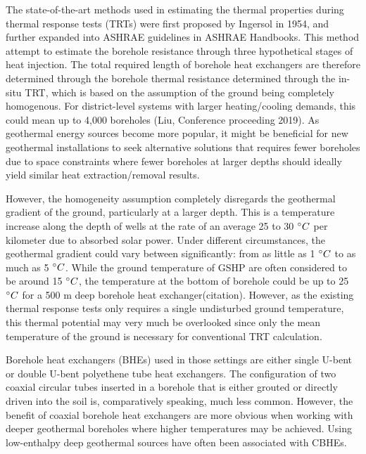 The state-of-the-art methods used in estimating the thermal properties during thermal response tests (TRTs) were first proposed by Ingersol in 1954, and further expanded into ASHRAE guidelines in ASHRAE Handbooks. This method attempt to estimate the borehole resistance through three hypothetical stages of heat injection. The total required length of borehole heat exchangers are therefore determined through the borehole thermal resistance determined through the in-situ TRT, which is based on the assumption of the ground being completely homogenous. For district-level systems with larger heating/cooling demands, this could mean up to 4,000 boreholes (Liu, Conference proceeding 2019). As geothermal energy sources become more popular, it might be beneficial for new geothermal installations to seek alternative solutions that requires fewer boreholes due to space constraints where fewer boreholes at larger depths should ideally yield similar heat extraction/removal results.

However, the homogeneity assumption completely disregards the geothermal gradient of the ground, particularly at a larger depth. This is a temperature increase along the depth of wells at the rate of an average 25 to 30 $\degree C$ per kilometer due to absorbed solar power. Under different circumstances, the geothermal gradient could vary between significantly: from as little as 1 $\degree C$ to as much as 5 $\degree C$. While the ground temperature of GSHP are often considered to be around 15 $\degree C$, the temperature at the bottom of borehole could be up to 25 $\degree C$ for a 500 m deep borehole heat exchanger(citation). However, as the existing thermal response tests only requires a single undisturbed ground temperature, this thermal potential may very much be overlooked since only the mean temperature of the ground is necessary for conventional TRT calculation. 

 Borehole heat exchangers (BHEs) used in those settings are either single U-bent or double U-bent polyethene tube heat exchangers. The configuration of two coaxial circular tubes inserted in a borehole that is either grouted or directly driven into the soil is, comparatively speaking, much less common\cite{zanchini_improving_2010}. However, the benefit of coaxial borehole heat exchangers are more obvious when working with deeper geothermal boreholes where higher temperatures may be achieved. Using low-enthalpy deep geothermal sources have often been associated with CBHEs\cite{dijkshoorn_measurements_2013}.  
 
